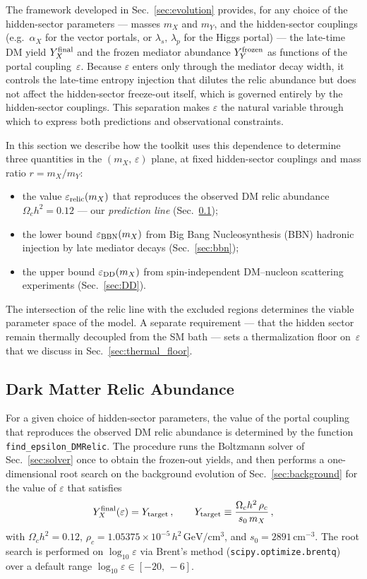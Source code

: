 \documentclass[11pt]{article}
\numberwithin{equation}{section}
\begin{document}
The framework developed in Sec.~\ref{sec:evolution} provides, for any choice of the hidden-sector parameters --- masses $m_X$ and $m_Y$, and the hidden-sector couplings (e.g.\ $\alpha_X$ for the vector portals, or $\lambda_s,\,\lambda_p$ for the Higgs portal) --- the late-time DM yield $Y_X^{\rm final}$ and the frozen mediator abundance $Y_Y^{\rm frozen}$ as functions of the portal coupling~$\varepsilon$. Because $\varepsilon$ enters only through the mediator decay width, it controls the late-time entropy injection that dilutes the relic abundance but does not affect the hidden-sector freeze-out itself, which is governed entirely by the hidden-sector couplings. This separation makes $\varepsilon$ the natural variable through which to express both predictions and observational constraints.

In this section we describe how the toolkit uses this dependence to determine three quantities in the $(m_X,\,\varepsilon)$ plane, at fixed hidden-sector couplings and mass ratio $r = m_X/m_Y$:
\begin{itemize}
    \item the value $\varepsilon_{\rm relic}(m_X)$ that reproduces the observed DM relic abundance $\Omega_c h^2 = 0.12$ --- our \emph{prediction line} (Sec.~\ref{sec:eps_relic});
    \item the lower bound $\varepsilon_{\rm BBN}(m_X)$ from Big Bang Nucleosynthesis (BBN) hadronic injection by late mediator decays (Sec.~\ref{sec:bbn});
    \item the upper bound $\varepsilon_{\rm DD}(m_X)$ from spin-independent DM--nucleon scattering experiments (Sec.~\ref{sec:DD}).
\end{itemize}
The intersection of the relic line with the excluded regions determines the viable parameter space of the model. A separate requirement --- that the hidden sector remain thermally decoupled from the SM bath --- sets a thermalization floor on~$\varepsilon$ that we discuss in Sec.~\ref{sec:thermal_floor}.

\subsection{Dark Matter Relic Abundance}
\label{sec:eps_relic}

For a given choice of hidden-sector parameters, the value of the portal coupling that reproduces the observed DM relic abundance is determined by the function \texttt{find\_epsilon\_DMRelic}. The procedure runs the Boltzmann solver of Sec.~\ref{sec:solver} once to obtain the frozen-out yields, and then performs a one-dimensional root search on the background evolution of Sec.~\ref{sec:background} for the value of $\varepsilon$ that satisfies
\begin{equation}
  Y_X^{\rm final}(\varepsilon) = Y_{\rm target}\,, \qquad
  Y_{\rm target} \equiv \frac{\Omega_c h^2\,\rho_c}{s_0\,m_X}\,,
  \label{eq:Y_target}
\end{equation}
with $\Omega_c h^2 = 0.12$, $\rho_c = 1.05375\times 10^{-5}\,h^2\,\mathrm{GeV/cm^3}$, and $s_0 = 2891\,\mathrm{cm^{-3}}$. The root search is performed on $\log_{10}\varepsilon$ via Brent's method (\texttt{scipy.optimize.brentq}) over a default range $\log_{10}\varepsilon \in [-20,\,-6]$.
\end{document}
